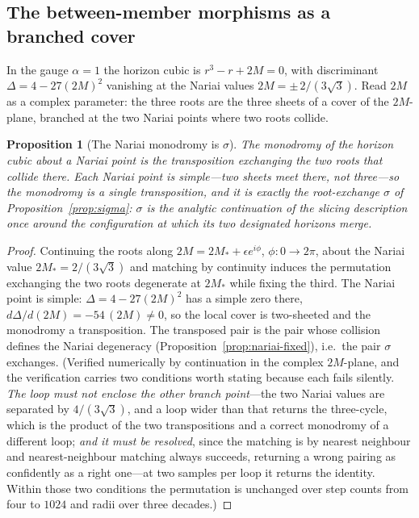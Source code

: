 \documentclass[11pt,a4paper]{article}
\newtheorem{proposition}[theorem]{Proposition}
\theoremstyle{definition}
\begin{document}
\subsection{The between-member morphisms as a branched cover}\label{sec:deck}

In the gauge $\alpha=1$ the horizon cubic is $r^{3}-r+2M=0$, with discriminant $\Delta=4-27(2M)^{2}$ vanishing at the Nariai values $2M=\pm\,2/(3\sqrt{3})$. Read $2M$ as a complex parameter: the three roots are the three sheets of a cover of the $2M$-plane, branched at the two Nariai points where two roots collide.

\begin{proposition}[The Nariai monodromy is $\sigma$]\label{prop:monodromy}
The monodromy of the horizon cubic about a Nariai point is the transposition exchanging the two roots that collide there. Each Nariai point is simple---two sheets meet there, not three---so the monodromy is a single transposition, and it is exactly the root-exchange $\sigma$ of Proposition~\ref{prop:sigma}: $\sigma$ is the analytic continuation of the slicing description once around the configuration at which its two designated horizons merge.
\end{proposition}

\begin{proof}
Continuing the roots along $2M=2M_{\ast}+\epsilon e^{i\phi}$, $\phi:0\to2\pi$, about the Nariai value $2M_{\ast}=2/(3\sqrt{3})$ and matching by continuity induces the permutation exchanging the two roots degenerate at $2M_{\ast}$ while fixing the third. The Nariai point is simple: $\Delta=4-27(2M)^{2}$ has a simple zero there, $d\Delta/d(2M)=-54\,(2M)\neq0$, so the local cover is two-sheeted and the monodromy a transposition. The transposed pair is the pair whose collision defines the Nariai degeneracy (Proposition~\ref{prop:nariai-fixed}), i.e.\ the pair $\sigma$ exchanges. (Verified numerically by continuation in the complex $2M$-plane, and the verification carries two conditions worth stating because each fails silently. \emph{The loop must not enclose the other branch point}---the two Nariai values are separated by $4/(3\sqrt3)$, and a loop wider than that returns the three-cycle, which is the product of the two transpositions and a correct monodromy of a different loop; \emph{and it must be resolved}, since the matching is by nearest neighbour and nearest-neighbour matching always succeeds, returning a wrong pairing as confidently as a right one---at two samples per loop it returns the identity. Within those two conditions the permutation is unchanged over step counts from four to $1024$ and radii over three decades.)
\end{proof}
\end{document}
